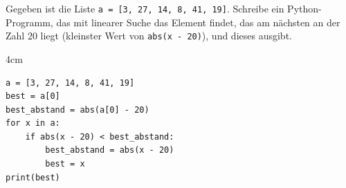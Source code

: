 \question[4]
Gegeben ist die Liste \texttt{a = [3, 27, 14, 8, 41, 19]}. Schreibe ein Python-Programm, 
das mit linearer Suche das Element findet, das am nächsten an der Zahl 20 liegt 
(kleinster Wert von \texttt{abs(x - 20)}), und dieses ausgibt.

\begin{solutionbox}{4cm}
\begin{lstlisting}
a = [3, 27, 14, 8, 41, 19]
best = a[0]
best_abstand = abs(a[0] - 20)
for x in a:
    if abs(x - 20) < best_abstand:
        best_abstand = abs(x - 20)
        best = x
print(best)
\end{lstlisting}
\end{solutionbox}